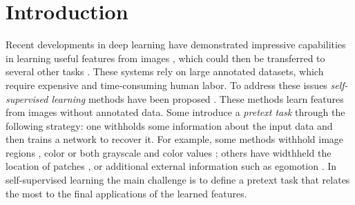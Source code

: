 \documentclass[10pt,twocolumn,letterpaper]{article}
\begin{document}
\section{Introduction}
Recent developments in deep learning have demonstrated impressive capabilities in learning useful features from images \cite{krizhevsky2012imagenet}, which could then be transferred to several other tasks \cite{girshickICCV15fastrcnn,girshick14CVPR,renNIPS15fasterrcnn,sharif2014cnn}.
These systems rely on large annotated datasets, which require expensive and time-consuming human labor.
To address these issues \emph{self-supervised learning} methods have been proposed \cite{doersch2015unsupervised,noroozi2016unsupervised,pathak2016context,wang2015unsupervised,zhang2016colorful}.
These methods learn features from images without annotated data. Some introduce a \emph{pretext task} through the following strategy: one withholds some information about the input data and then trains a network to recover it. For example, some methods withhold image regions \cite{pathak2016context}, color \cite{zhang2016colorful} or both grayscale and color  values \cite{zhang2016split}; others have widthheld the location of patches \cite{doersch2015unsupervised,noroozi2016unsupervised}, or additional external information such as egomotion \cite{jayaraman2015learning}.
In self-supervised learning the main challenge is to define a pretext task that relates the most to the final applications of the learned features.
\end{document}
